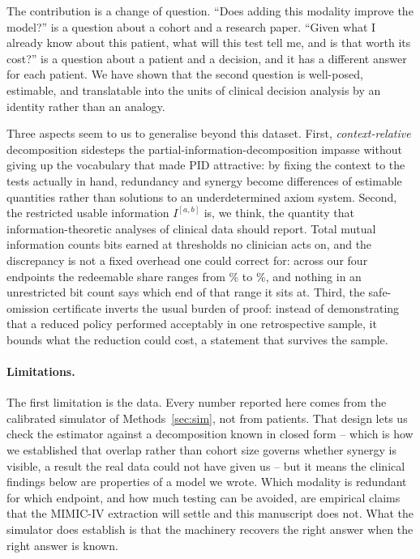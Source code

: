 \documentclass[11pt]{article}
\theoremstyle{definition}
\theoremstyle{remark}
\begin{document}
The contribution is a change of question. ``Does adding this modality improve the
model?'' is a question about a cohort and a research paper. ``Given what I
already know about this patient, what will this test tell me, and is that worth
its cost?'' is a question about a patient and a decision, and it has a different
answer for each patient. We have shown that the second question is
well-posed, estimable, and translatable into the units of clinical decision
analysis by an identity rather than an analogy.

Three aspects seem to us to generalise beyond this dataset. First,
\emph{context-relative} decomposition sidesteps the partial-information-decomposition
impasse without giving up the vocabulary that made PID attractive: by fixing the
context to the tests actually in hand, redundancy and synergy become differences
of estimable quantities rather than solutions to an underdetermined axiom system.
Second, the restricted usable information $I^{[a,b]}$ is, we think, the quantity
that information-theoretic analyses of clinical data should report. Total mutual
information counts bits earned at thresholds no clinician acts on, and the
discrepancy is not a fixed overhead one could correct for: across our four
endpoints the redeemable share ranges from \restrictedShareMin\% to
\restrictedShareMax\%, and nothing in an unrestricted bit count says which end
of that range it sits at. Third, the safe-omission
certificate inverts the usual burden of proof: instead of demonstrating that a
reduced policy performed acceptably in one retrospective sample, it bounds what
the reduction could cost, a statement that survives the sample.

\paragraph{Limitations.} The first limitation is the data. Every number
reported here comes from the calibrated simulator of Methods~\ref{sec:sim}, not
from patients. That design lets us check the estimator against a decomposition
known in closed form -- which is how we established that overlap rather than
cohort size governs whether synergy is visible, a result the real data could not
have given us -- but it means the clinical findings below are properties of a
model we wrote. Which modality is redundant for which endpoint, and how much
testing can be avoided, are empirical claims that the MIMIC-IV extraction will
settle and this manuscript does not. What the simulator does establish is that
the machinery recovers the right answer when the right answer is known.
\end{document}
